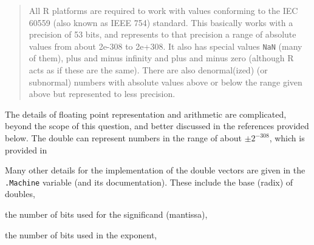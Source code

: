 \documentclass[]{book}
\newenvironment{Shaded}{\begin{snugshade}}{\end{snugshade}}
\newcommand{\CommentTok}[1]{\textcolor[rgb]{0.56,0.35,0.01}{\textit{#1}}}
\newcommand{\NormalTok}[1]{#1}
\newcommand{\OperatorTok}[1]{\textcolor[rgb]{0.81,0.36,0.00}{\textbf{#1}}}
\theoremstyle{plain}
\theoremstyle{remark}
\theoremstyle{definition}
\theoremstyle{definition}
\theoremstyle{definition}
\theoremstyle{remark}
\begin{document}
\begin{quote}
All R platforms are required to work with values conforming to the IEC
60559 (also known as IEEE 754) standard. This basically works with a
precision of 53 bits, and represents to that precision a range of
absolute values from about 2e-308 to 2e+308. It also has special values
\texttt{NaN} (many of them), plus and minus infinity and plus and minus
zero (although R acts as if these are the same). There are also
denormal(ized) (or subnormal) numbers with absolute values above or
below the range given above but represented to less precision.
\end{quote}

The details of floating point representation and arithmetic are
complicated, beyond the scope of this question, and better discussed in
the references provided below. The double can represent numbers in the
range of about \(\pm 2^{-308}\), which is provided in

\begin{Shaded}
\end{Shaded}

Many other details for the implementation of the double vectors are
given in the \texttt{.Machine} variable (and its documentation). These
include the base (radix) of doubles,

\begin{Shaded}
\end{Shaded}

the number of bits used for the significand (mantissa),

\begin{Shaded}
\end{Shaded}

the number of bits used in the exponent,

\begin{Shaded}
\end{Shaded}
\end{document}
